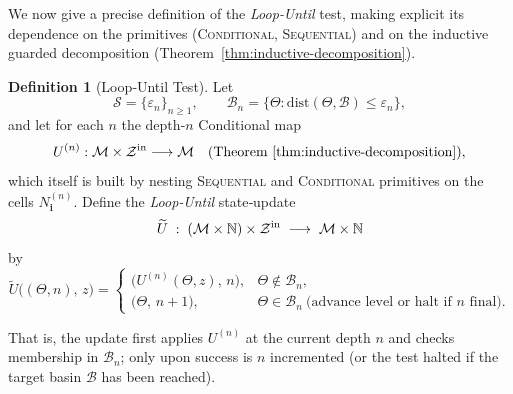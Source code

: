 \documentclass[12pt]{article}
\theoremstyle{definition}
\newtheorem{definition}{Definition}[section]
\theoremstyle{plain}
\begin{document}
We now give a precise definition of the \emph{Loop‑Until} test, making explicit its dependence on the primitives (\textsc{Conditional}, \textsc{Sequential}) and on the inductive guarded decomposition (Theorem~\ref{thm:inductive-decomposition}).

\begin{definition}[Loop‑Until Test]
\label{def:loop-until}
Let
\[
  \mathcal S=\{\varepsilon_n\}_{n\ge1}, 
  \qquad
  \mathcal B_n=\bigl\{\Theta:\mathrm{dist}(\Theta,\mathcal B)\le\varepsilon_n\bigr\},
\]
and let for each $n$ the depth‑$n$ {\upshape Conditional} map
\[
  U^{(n)}:\mathcal M\times\mathcal Z^{\rm in}\longrightarrow \mathcal M
  \quad\text{(Theorem~\ref{thm:inductive-decomposition})},
\]
which itself is built by nesting \textsc{Sequential} and \textsc{Conditional} primitives on the cells $N^{(n)}_{\mathbf i}$.  Define the \emph{Loop‑Until} state‑update
\[
  \widetilde U\;:\;(\mathcal M\times\mathbb N)\times\mathcal Z^{\rm in}
  \;\longrightarrow\;\mathcal M\times\mathbb N
\]
by
\[
  \widetilde U\bigl((\Theta,n),\,z\bigr)
  =
  \begin{cases}
    \bigl(U^{(n)}(\Theta,z),\,n\bigr), 
    & \Theta\notin\mathcal B_n, \\[6pt]
    \bigl(\Theta,\,n+1\bigr), 
    & \Theta\in\mathcal B_n\ \text{(advance level or halt if $n$ final)}.
  \end{cases}
\]
\noindent

That is, the update first applies $U^{(n)}$ at the current depth $n$ and checks membership in $\mathcal{B}_n$; only upon success is $n$ incremented (or the test halted if the target basin $\mathcal{B}$ has been reached).


\end{definition}
\end{document}
